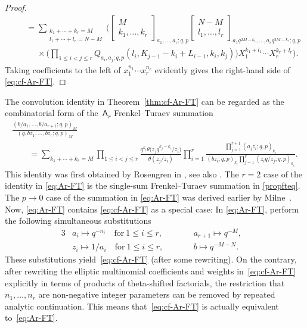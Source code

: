 \documentclass[pdftex]{sigma}
\numberwithin{equation}{section}
\theoremstyle{definition}
\newcommand{\ta}{\theta}
\begin{document}
\begin{proof}
\begin{gather*}
\qquad=\sum_{\substack{k_1+\cdots+k_r=M\\l_1+\cdots+l_r=N-M}}\bigg(
\begin{bmatrix}M\\k_1,\dots,k_r\end{bmatrix}_{a_1,\dots,a_r;q,p}
\begin{bmatrix}N-M\\l_1,\dots,l_r\end{bmatrix}_{a_1q^{2M-k_1},\dots,a_rq^{2M-k_r};q,p}\\
\phantom{\qquad=}{}\times
 \bigg(\prod_{1\le i<j\le r}Q_{a_i,a_j;q,p}(l_i,K_{j-1}-k_i+L_{i-1},k_i,k_j)\bigg)
X_1^{k_1+l_1}\cdots X_r^{k_r+l_r}\bigg).
\end{gather*}
Taking coefficients to the left of $x_1^{n_1}\cdots x_r^{n_r}$ evidently
gives the right-hand side of \eqref{eq:cf-Ar-FT}.
\end{proof}

The convolution identity in Theorem~\ref{thm:cf-Ar-FT} can be regarded
as the combinatorial form of the~$\mathsf A_r$ Frenkel--Turaev
summation
\begin{gather}
\frac{(b/a_1,\dots,b/a_{r+1};q,p)_M}{(q,bz_1,\dots,bz_r;q,p)_M}\nonumber\\
\qquad=\sum_{k_1+\cdots+k_r=M}\prod_{1\le i<j\le r}
\frac{q^{k_i} \ta\bigl(z_jq^{k_j-k_i}/z_i\bigr)}{\ta(z_j/z_i)}
\prod_{i=1}^r\frac{\prod_{j=1}^{r+1}(a_jz_i;q,p)_{k_i}}
{(bz_i;q,p)_{k_i}\prod_{j=1}^r(z_iq/z_j;q,p)_{k_i}}.\label{eq:Ar-FT}
\end{gather}
This identity
was first obtained by Rosengren in \cite[Theorem~5.1]{R04},
see also \cite[equation~(11.7.8)]{GR}.
The $r=2$ case of the identity in \eqref{eq:Ar-FT} is the single-sum
Frenkel--Turaev summation in \eqref{propfteq}.
The $p\to 0$ case of the summation in \eqref{eq:Ar-FT}
was derived earlier by Milne~\cite[Theorem~6.17]{M88}.
Now, \eqref{eq:Ar-FT} contains \eqref{eq:cf-Ar-FT} as a special case:
In \eqref{eq:Ar-FT}, perform the following simultaneous substitutions
\begin{alignat*}{3}
& a_i\mapsto q^{-n_i}\quad\text{for}\ 1\le i\le r,\qquad&&
 a_{r+1}\mapsto q^{-M},&\\
& z_i\mapsto 1/a_i\quad\text{for}\ 1\le i\le r,\qquad&&
 b\mapsto q^{-M-N}.&
\end{alignat*}
These substitutions yield~\eqref{eq:cf-Ar-FT} (after some rewriting).
On the contrary, after rewriting the elliptic multinomial coefficients
and weights in~\eqref{eq:cf-Ar-FT} explicitly in terms of products
of theta-shifted factorials,
the restriction that $n_1,\dots,n_r$ are non-negative integer parameters
can be removed by repeated analytic continuation.
This means that~\eqref{eq:cf-Ar-FT} is actually equivalent to~\eqref{eq:Ar-FT}.
\end{document}
